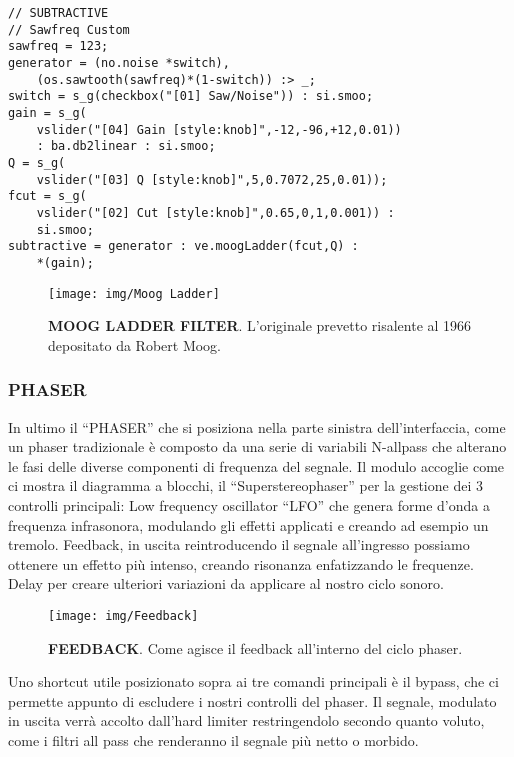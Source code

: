 \documentclass[
	a4paper,
	twocolumn
	]{article}
\begin{document}
\begin{lstlisting}
// SUBTRACTIVE
// Sawfreq Custom
sawfreq = 123;
generator = (no.noise *switch),
	(os.sawtooth(sawfreq)*(1-switch)) :> _;
switch = s_g(checkbox("[01] Saw/Noise")) : si.smoo;
gain = s_g(
	vslider("[04] Gain [style:knob]",-12,-96,+12,0.01))
	: ba.db2linear : si.smoo;
Q = s_g(
	vslider("[03] Q [style:knob]",5,0.7072,25,0.01));
fcut = s_g(
	vslider("[02] Cut [style:knob]",0.65,0,1,0.001)) :
	si.smoo;
subtractive = generator : ve.moogLadder(fcut,Q) :
	*(gain);
\end{lstlisting}

\begin{figure}[h]
\begin{center}
\texttt{[image: img/Moog Ladder]}
\caption{\textbf{MOOG LADDER FILTER}. L'originale prevetto risalente al 1966 depositato da Robert Moog.}
\label{gr01}
\end{center}
\end{figure}

\subsubsection*{PHASER}

In ultimo il “PHASER” che si posiziona nella parte sinistra dell’interfaccia, come un phaser tradizionale è composto da una serie di variabili N-allpass che alterano le fasi delle diverse componenti di frequenza del segnale. Il modulo accoglie come ci mostra il diagramma a blocchi, il “Superstereophaser” per la gestione dei 3 controlli principali: Low frequency oscillator “LFO” che genera forme d’onda a frequenza infrasonora, modulando gli effetti applicati e creando ad esempio un tremolo. Feedback, in uscita reintroducendo il segnale all'ingresso possiamo ottenere un effetto più intenso, creando risonanza enfatizzando le frequenze. Delay per creare ulteriori variazioni da applicare al nostro ciclo sonoro.  

\begin{figure}[h]
\begin{center}
\texttt{[image: img/Feedback]}
\caption{\textbf{FEEDBACK}. Come agisce il feedback all'interno del ciclo phaser.}
\label{gr01}
\end{center}
\end{figure}

Uno shortcut utile posizionato sopra ai tre comandi principali è il bypass, che ci permette appunto di escludere i nostri controlli del phaser. Il segnale, modulato in uscita verrà accolto dall’hard limiter restringendolo secondo quanto voluto, come i filtri all pass che renderanno il segnale più netto o morbido.
\end{document}
